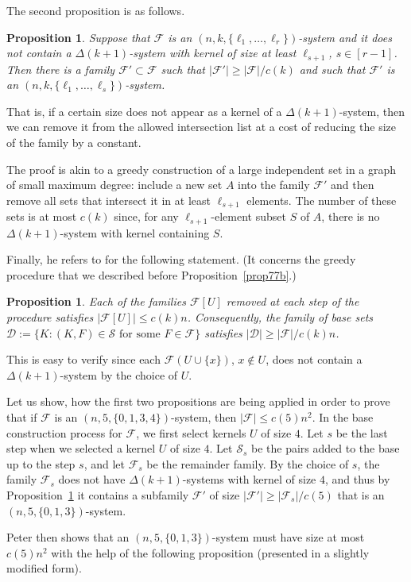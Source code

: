\documentclass[graybox]{svmult}
\renewcommand{\le}{\leqslant}
\renewcommand{\ge}{\geqslant}
\newcommand{\ff}{\mathcal{F}}
\newcommand{\m}{\mathcal}
\newtheorem{prop}[thm]{Proposition}
\begin{document}
The second proposition is as follows.
\begin{prop}\label{prop77c} Suppose that $\ff$ is an $(n,k,\{\ell_1,\ldots, \ell_r\})$-system and it does not contain a $\Delta(k+1)$-system with kernel of size at least $\ell_{s+1}$, $s\in [r-1]$. Then there is a family $\ff'\subset \ff$ such that $|\ff'|\ge |\ff|/c(k)$ and such that $\ff'$ is an $(n,k,\{\ell_1,\ldots, \ell_s\})$-system.
\end{prop}
That is, if a certain size does not appear as a kernel of a $\Delta(k+1)$-system, then we can remove it from the allowed intersection list at a cost of reducing the size of the family by a constant.

The proof is akin to a greedy construction of a large independent set in a graph of small maximum degree: include a new set $A$ into the family $\ff'$ and then remove all sets that intersect it in at least $\ell_{s+1}$ elements. The number of these sets is at most $c(k)$ since, for any $\ell_{s+1}$-element subset $S$ of $A$, there is no $\Delta(k+1)$-system with kernel containing $S$.


Finally, he refers to \cite{Fra77b} for the following statement. (It concerns the greedy procedure that we described before  Proposition~\ref{prop77b}.)

\begin{prop}\label{prop77a} Each of the families $\ff[U]$ removed at each step of the procedure satisfies $|\ff[U]|\le c(k)n$. Consequently, the family of base sets $\m D:=\{K: (K,F)\in \m S\text{ for some }F\in \ff\}$ satisfies  $|\m D|\ge |\ff|/c(k)n$.
\end{prop}
This is easy to verify since each $\ff(U\cup\{x\})$, $x\not\in U$, does not contain a $\Delta(k+1)$-system by the choice of $U$.



Let us show, how the first two propositions are being applied in order to prove that if $\ff$ is an $(n,5,\{0,1,3,4\})$-system, then $|\ff|\le c(5)n^2$. In the base construction process for $\ff$, we first select kernels $U$ of size $4$. Let $s$ be the last step when we selected a kernel $U$ of size $4$. Let $\m S_s$ be the pairs added to the base up to the step $s$, and let $\ff_s$ be the remainder family. By the choice of $s$, the family $\ff_s$ does not have $\Delta(k+1)$-systems with kernel of size $4$, and thus by Proposition~\ref{prop77c} it contains a subfamily $\ff'$ of size $|\ff'|\ge |\ff_s|/c(5)$ that is an $(n,5,\{0,1,3\})$-system.


Peter then shows that an $(n,5,\{0,1,3\})$-system must have size at most $c(5)n^2$ with the help of the following proposition (presented in a slightly modified form).
\end{document}
